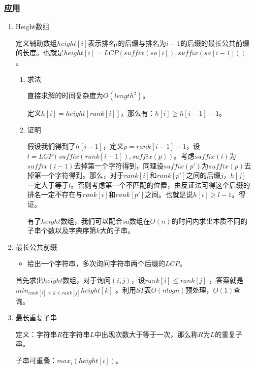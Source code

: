 \documentclass[11pt]{article}
\begin{document}
\subsubsection{应用}
\label{sec:org7426e29}
\begin{enumerate}
\item Height数组
\label{sec:orgacc9efa}

定义辅助数组\(height[i]\)表示排名\(i\)的后缀与排名为\(i-1\)的后缀的最长公共前缀的长度。也就是\(height[i]=LCP(suffix(sa[i]),suffix(sa[i-1]))\)。

\begin{enumerate}
\item 求法
\label{sec:orgbc57743}

直接求解的时间复杂度为\(O(length^2)\)。

定义\(h[i]=height[rank[i]]\)，那么有：\(h[i] \geq h[i-1]-1\)。

\item 证明
\label{sec:org5f3de57}

假设我们得到了\(h[i-1]\)，定义\(p=rank[i-1]-1\)，设\(l=LCP(suffix(rank[i-1]),suffix(p))\)。考虑\(suffix(i)\)为\(suffix(i-1)\)去掉第一个字符得到，同理设\(suffix(p')\)为\(suffix(p)\)去掉第一个字符得到。那么，对于\(rank[i]\)和\(rank[p']\)之间的后缀\(j\)，\(h[j]\)一定大于等于\(l\)。否则考虑第一个不匹配的位置，由反证法可得这个后缀的排名一定不存在与\(rank[i]\)和\(rank[p']\)之间。也就是说\(h[i] \geq l-1\)。得证。

有了\(height\)数组，我们可以配合\(sa\)数组在\(O(n)\)的时间内求出本质不同的子串个数以及字典序第\(k\)大的子串。
\end{enumerate}

\item 最长公共前缀
\label{sec:orgd46f36d}

\begin{itemize}
\item 给出一个字符串，多次询问字符串两个后缀的\(LCP\)。
\end{itemize}

首先求出\(height\)数组，对于询问\((i,j)\)，设\(rank[i]\leq rank[j]\) ，答案就是\(min_{rank[i]\leq k \leq rank[j]}height[k]\) 。利用\(ST\)表\(O(nlogn)\)预处理，\(O(1)\)查询。

\item 最长重复子串
\label{sec:orgc2feaf2}

定义：字符串\(R\)在字符串\(L\)中出现次数大于等于一次，那么称\(R\)为\(L\)的重复子串。

子串可重叠：\(max_i(height[i])\)。


\end{enumerate}
\end{document}

